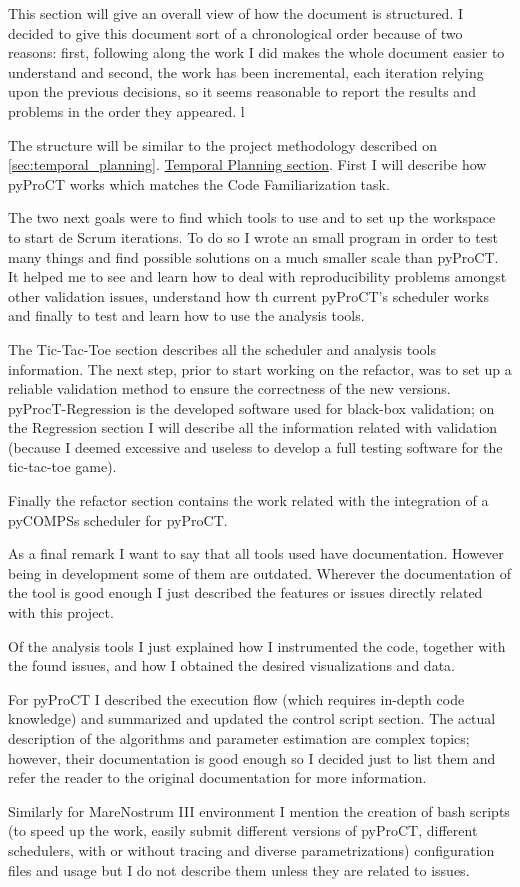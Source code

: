 This section will give an overall view of how the document is structured. I decided to give this document sort of a chronological order because of two reasons: first, following along the work I did makes the whole document easier to understand and second, the work has been incremental, each iteration relying upon the previous decisions, so it seems reasonable to report the results and problems in the order they appeared. l


The structure will be similar to the project methodology described on \ref{sec:temporal_planning}. \hyperref[sec:temporal_planning]{Temporal Planning section}. First I will describe how pyProCT works which matches the Code Familiarization task. 

The two next goals were to find which tools to use and to set up the workspace to start de Scrum iterations. To do so I wrote an small program in order to test many things and find possible solutions on a much smaller scale than pyProCT. It helped me to see and learn how to deal with reproducibility problems amongst other validation issues, understand how th current pyProCT's scheduler works and finally to test and learn how to use the analysis tools. 

The Tic-Tac-Toe section describes all the scheduler and analysis tools information. The next step, prior to start working on the refactor, was to set up a reliable validation method to ensure the correctness of the new versions. pyProcT-Regression is the developed software used for black-box validation; on the  Regression section I will describe all the information related with validation (because I deemed excessive and useless to develop a full testing software for the tic-tac-toe game).

Finally the refactor section contains the work related with the integration of a pyCOMPSs scheduler for pyProCT. 

As a final remark I want to say that all tools used have documentation. However being in development some of them are outdated. Wherever the documentation of the tool is good enough I just described the features or issues directly related with this project. 

Of the analysis tools I just explained how I instrumented the code, together with the found issues, and how I obtained the desired visualizations and data.

For pyProCT I described the execution flow (which requires in-depth code knowledge) and summarized and updated the control script section. The actual description of the algorithms and parameter estimation are complex topics; however, their documentation is good enough so I decided just to list them and refer the reader to the original documentation for more information.

Similarly for MareNostrum III environment I mention the creation of bash scripts (to speed up the work, easily submit different versions of pyProCT, different schedulers, with or without tracing and diverse parametrizations) configuration files and usage but I do not describe them unless they are related to issues.


